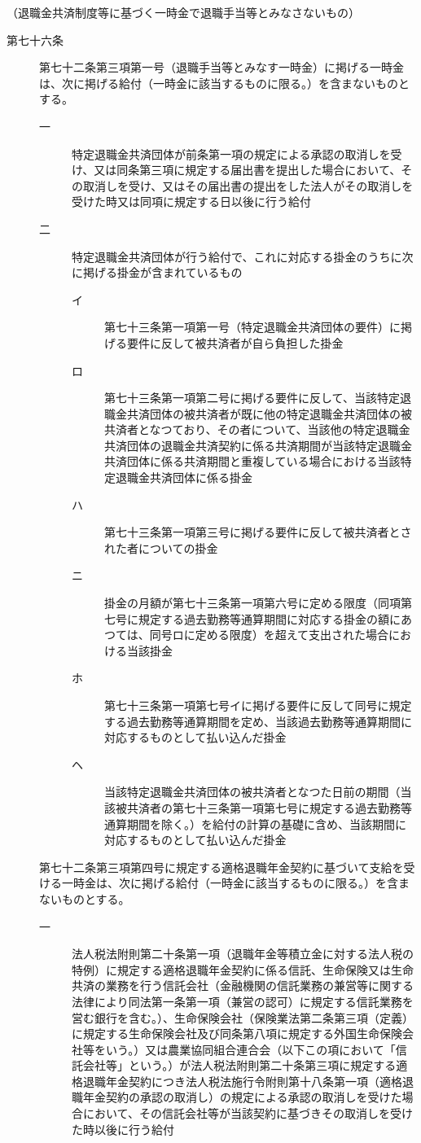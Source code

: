 \documentclass[twocolumn,a4j,10pt]{ltjtarticle}
\begin{document}
\noindent\hspace{10pt}（退職金共済制度等に基づく一時金で退職手当等とみなさないもの）
\begin{description}
\item[第七十六条]第七十二条第三項第一号（退職手当等とみなす一時金）に掲げる一時金は、次に掲げる給付（一時金に該当するものに限る。）を含まないものとする。
\begin{description}
\item[一]特定退職金共済団体が前条第一項の規定による承認の取消しを受け、又は同条第三項に規定する届出書を提出した場合において、その取消しを受け、又はその届出書の提出をした法人がその取消しを受けた時又は同項に規定する日以後に行う給付
\item[二]特定退職金共済団体が行う給付で、これに対応する掛金のうちに次に掲げる掛金が含まれているもの
\begin{description}
\item[イ]第七十三条第一項第一号（特定退職金共済団体の要件）に掲げる要件に反して被共済者が自ら負担した掛金
\item[ロ]第七十三条第一項第二号に掲げる要件に反して、当該特定退職金共済団体の被共済者が既に他の特定退職金共済団体の被共済者となつており、その者について、当該他の特定退職金共済団体の退職金共済契約に係る共済期間が当該特定退職金共済団体に係る共済期間と重複している場合における当該特定退職金共済団体に係る掛金
\item[ハ]第七十三条第一項第三号に掲げる要件に反して被共済者とされた者についての掛金
\item[ニ]掛金の月額が第七十三条第一項第六号に定める限度（同項第七号に規定する過去勤務等通算期間に対応する掛金の額にあつては、同号ロに定める限度）を超えて支出された場合における当該掛金
\item[ホ]第七十三条第一項第七号イに掲げる要件に反して同号に規定する過去勤務等通算期間を定め、当該過去勤務等通算期間に対応するものとして払い込んだ掛金
\item[ヘ]当該特定退職金共済団体の被共済者となつた日前の期間（当該被共済者の第七十三条第一項第七号に規定する過去勤務等通算期間を除く。）を給付の計算の基礎に含め、当該期間に対応するものとして払い込んだ掛金
\end{description}
\end{description}
\item[]第七十二条第三項第四号に規定する適格退職年金契約に基づいて支給を受ける一時金は、次に掲げる給付（一時金に該当するものに限る。）を含まないものとする。
\begin{description}
\item[一]法人税法附則第二十条第一項（退職年金等積立金に対する法人税の特例）に規定する適格退職年金契約に係る信託、生命保険又は生命共済の業務を行う信託会社（金融機関の信託業務の兼営等に関する法律により同法第一条第一項（兼営の認可）に規定する信託業務を営む銀行を含む。）、生命保険会社（保険業法第二条第三項（定義）に規定する生命保険会社及び同条第八項に規定する外国生命保険会社等をいう。）又は農業協同組合連合会（以下この項において「信託会社等」という。）が法人税法附則第二十条第三項に規定する適格退職年金契約につき法人税法施行令附則第十八条第一項（適格退職年金契約の承認の取消し）の規定による承認の取消しを受けた場合において、その信託会社等が当該契約に基づきその取消しを受けた時以後に行う給付

\end{description}
\end{description}
\end{document}
